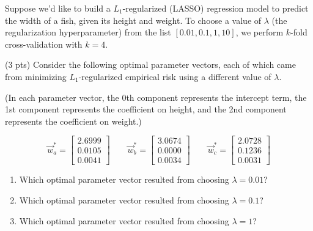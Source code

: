 \documentclass[twoside,12pt]{article}
\begin{document}
\begin{probset}
\begin{prob}[(9 pts)]
Suppose we'd like to build a $L_1$-regularized (LASSO) regression model to predict the width of a fish, given its height and weight. To choose a value of $\lambda$ (the regularization hyperparameter) from the list $[0.01, 0.1, 1, 10]$, we perform $k$-fold cross-validation with $k=4$.


\begin{subprobset}

\begin{subprob}(3 pts) Consider the following optimal parameter vectors, each of which came from minimizing $L_1$-regularized empirical risk using a different value of $\lambda$. 

(In each parameter vector, the 0th component represents the intercept term, the 1st component represents the coefficient on height, and the 2nd component represents the coefficient on weight.)

$$
\vec{w}_a^* = \begin{bmatrix} 2.6999 \\ 0.0105 \\ 0.0041 \end{bmatrix} \qquad
\vec{w}_b^* = \begin{bmatrix} 3.0674 \\ 0.0000 \\ 0.0034 \end{bmatrix} \qquad
\vec{w}_c^* = \begin{bmatrix} 2.0728 \\ 0.1236 \\ 0.0031 \end{bmatrix}
$$

\begin{enumerate}[label=(\roman*)]
    \item Which optimal parameter vector resulted from choosing $\lambda = 0.01$? 
    
      
    
    \item Which optimal parameter vector resulted from choosing $\lambda = 0.1$? 
    
      
    
    \item Which optimal parameter vector resulted from choosing $\lambda = 1$?
    
      
    
\end{enumerate}
    

\end{subprob}
\end{subprobset}
\end{prob}
\end{probset}
\end{document}
